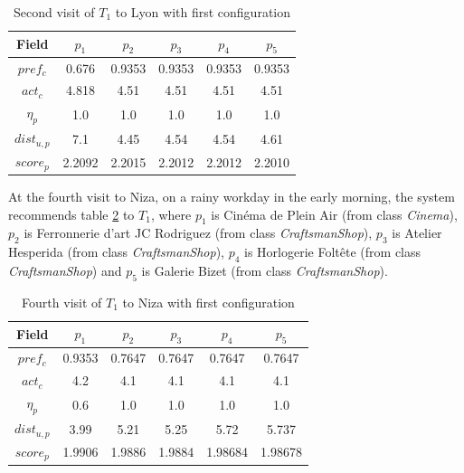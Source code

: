 \begin{table}[h!]
    \centering
    \begin{tabular}{ |c|c|c|c|c|c| } 
        \hline
        Field   & $p_1$ & $p_2$ & $p_3$ & $p_4$ & $p_5$ \\
        \hline
        $pref_c$    & 0.676 & 0.9353 & 0.9353 & 0.9353 & 0.9353 \\
        $act_c$     & 4.818 & 4.51 & 4.51 & 4.51 & 4.51 \\
        $\eta_p$    & 1.0 & 1.0 & 1.0 & 1.0 & 1.0 \\
        $dist_{u,p}$ & 7.1 & 4.45 & 4.54 & 4.54 & 4.61 \\
        $score_p$    & 2.2092 & 2.2015 & 2.2012 & 2.2012 & 2.2010 \\
        
        \hline
    \end{tabular}
    \caption{Second visit of $T_1$ to Lyon with first configuration}
    \label{table:t1-3}
\end{table}

At the fourth visit to Niza, on a rainy workday in the early morning, the system recommends table \ref{table:t1-2} to $T_1$, where $p_1$ is Cinéma de Plein Air (from class \textit{Cinema}), $p_2$ is Ferronnerie d'art JC Rodriguez (from class \textit{CraftsmanShop}), $p_3$ is Atelier Hesperida (from class \textit{CraftsmanShop}), $p_4$ is Horlogerie Foltête	(from class \textit{CraftsmanShop}) and $p_5$ is Galerie Bizet (from class \textit{CraftsmanShop}).

\begin{table}[h!]
    \centering
    \begin{tabular}{ |c|c|c|c|c|c| } 
        \hline
        Field   & $p_1$ & $p_2$ & $p_3$ & $p_4$ & $p_5$ \\
        \hline
        $pref_c$    &  0.9353 & 0.7647 & 0.7647 & 0.7647 & 0.7647 \\
        $act_c$     & 4.2 & 4.1 & 4.1 & 4.1 & 4.1 \\
        $\eta_p$    & 0.6 & 1.0 & 1.0 & 1.0 & 1.0 \\
        $dist_{u,p}$ & 3.99 & 5.21 & 5.25 & 5.72 & 5.737 \\
        $score_p$    & 1.9906 & 1.9886 & 1.9884 & 1.98684 & 1.98678 \\
        
        \hline
    \end{tabular}
    \caption{Fourth visit of $T_1$ to Niza with first configuration}
    \label{table:t1-2}
\end{table}

